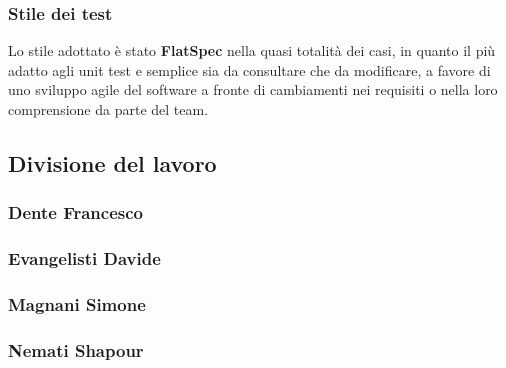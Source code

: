 \subsubsection{Stile dei test}
Lo stile adottato è stato \textbf{FlatSpec} nella quasi totalità dei casi, in quanto il più adatto agli unit test e semplice sia da consultare che da modificare, a favore di uno sviluppo agile del software a fronte di cambiamenti nei requisiti o nella loro comprensione da parte del team.


\subsection{Divisione del lavoro}

\subsubsection{Dente Francesco}

\subsubsection{Evangelisti Davide}

\subsubsection{Magnani Simone}

\subsubsection{Nemati Shapour}
